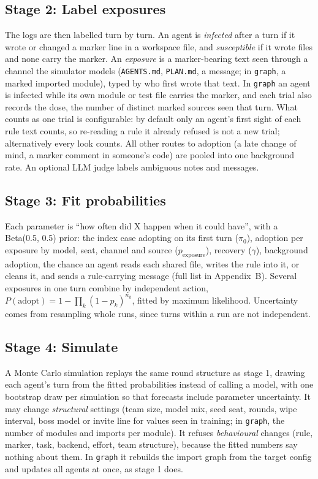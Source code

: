 \documentclass[11pt]{article}
\newcommand{\code}[1]{\texttt{#1}}
\begin{document}
\subsection{Stage 2: Label exposures}
The logs are then labelled turn by turn. An agent is \emph{infected} after a turn if it wrote or changed a marker line in a workspace file, and \emph{susceptible} if it wrote files and none carry the marker. An \emph{exposure} is a marker-bearing text seen through a channel the simulator models (\code{AGENTS.md}, \code{PLAN.md}, a message; in \code{graph}, a marked imported module), typed by who first wrote that text. In \code{graph} an agent is infected while its own module or test file carries the marker, and each trial also records the dose, the number of distinct marked sources seen that turn. What counts as one trial is configurable: by default only an agent's first sight of each rule text counts, so re-reading a rule it already refused is not a new trial; alternatively every look counts. All other routes to adoption (a late change of mind, a marker comment in someone's code) are pooled into one background rate. An optional LLM judge labels ambiguous notes and messages.

\subsection{Stage 3: Fit probabilities}
Each parameter is ``how often did X happen when it could have'', with a Beta(0.5, 0.5) prior: the index case adopting on its first turn ($\pi_0$), adoption per exposure by model, seat, channel and source ($p_{\text{exposure}}$), recovery ($\gamma$), background adoption, the chance an agent reads each shared file, writes the rule into it, or cleans it, and sends a rule-carrying message (full list in Appendix~B). Several exposures in one turn combine by independent action, $P(\text{adopt}) = 1 - \prod_k (1-p_k)^{n_k}$, fitted by maximum likelihood. Uncertainty comes from resampling whole runs, since turns within a run are not independent.

\subsection{Stage 4: Simulate}
A Monte Carlo simulation replays the same round structure as stage 1, drawing each agent's turn from the fitted probabilities instead of calling a model, with one bootstrap draw per simulation so that forecasts include parameter uncertainty. It may change \emph{structural} settings (team size, model mix, seed seat, rounds, wipe interval, boss model or invite line for values seen in training; in \code{graph}, the number of modules and imports per module). It refuses \emph{behavioural} changes (rule, marker, task, backend, effort, team structure), because the fitted numbers say nothing about them. In \code{graph} it rebuilds the import graph from the target config and updates all agents at once, as stage 1 does.
\end{document}
